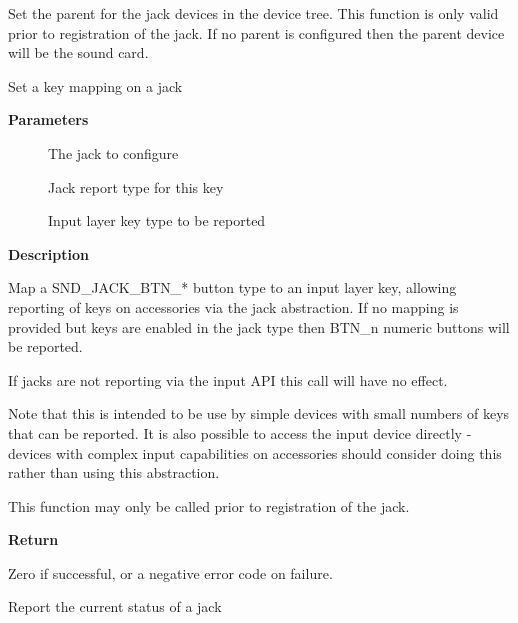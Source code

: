 \documentclass[a4paper,8pt,english]{sphinxmanual}
\begin{document}
Set the parent for the jack devices in the device tree.  This
function is only valid prior to registration of the jack.  If no
parent is configured then the parent device will be the sound card.

\begin{fulllineitems}
\label{sound/kernel-api/alsa-driver-api:c.snd_jack_set_key}
Set a key mapping on a jack

\end{fulllineitems}


\textbf{Parameters}
\begin{description}
\item[{}] \leavevmode
The jack to configure

\item[{}] \leavevmode
Jack report type for this key

\item[{}] \leavevmode
Input layer key type to be reported

\end{description}

\textbf{Description}

Map a SND\_JACK\_BTN\_* button type to an input layer key, allowing
reporting of keys on accessories via the jack abstraction.  If no
mapping is provided but keys are enabled in the jack type then
BTN\_n numeric buttons will be reported.

If jacks are not reporting via the input API this call will have no
effect.

Note that this is intended to be use by simple devices with small
numbers of keys that can be reported.  It is also possible to
access the input device directly - devices with complex input
capabilities on accessories should consider doing this rather than
using this abstraction.

This function may only be called prior to registration of the jack.

\textbf{Return}

Zero if successful, or a negative error code on failure.

\begin{fulllineitems}
\label{sound/kernel-api/alsa-driver-api:c.snd_jack_report}
Report the current status of a jack

\end{fulllineitems}
\end{document}
